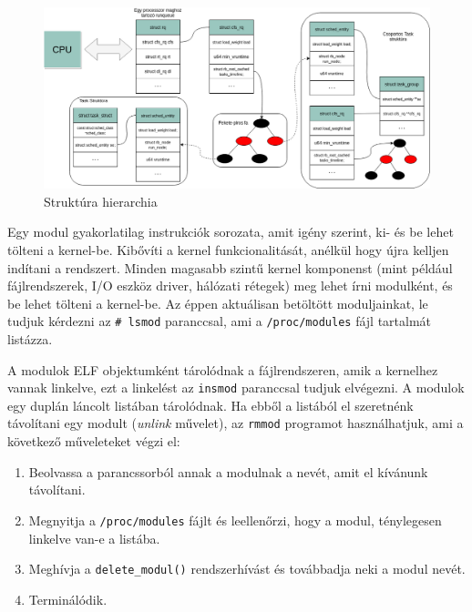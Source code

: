 \begin{figure}[h!]
\centering
\includegraphics[width=\textwidth]{images/structureHierarchy.png}
\caption{Struktúra hierarchia}
\label{fig:structurehierarchi}
\end{figure}



Egy modul gyakorlatilag instrukciók sorozata, amit igény szerint, ki- és be lehet tölteni a kernel-be. Kibővíti a kernel funkcionalitását, anélkül hogy újra kelljen indítani a rendszert. Minden magasabb szintű kernel komponenst (mint például fájlrendszerek, I/O eszköz driver, hálózati rétegek) meg lehet írni modulként, és be lehet tölteni a kernel-be.
Az éppen aktuálisan betöltött moduljainkat, le tudjuk kérdezni az \texttt{\# lsmod} paranccsal, ami a \texttt{/proc/modules} fájl tartalmát listázza.

A modulok ELF objektumként tárolódnak a fájlrendszeren, amik a kernelhez vannak linkelve, ezt a linkelést az \texttt{insmod} paranccsal tudjuk elvégezni.
A modulok egy duplán láncolt listában tárolódnak.
Ha ebből a listából el szeretnénk távolítani egy modult (\textit{unlink} művelet), az \texttt{rmmod} programot használhatjuk, ami a következő műveleteket végzi el:
\begin{enumerate}
	\item Beolvassa a parancssorból annak a modulnak a nevét, amit el kívánunk távolítani.
	\item Megnyitja a \texttt{/proc/modules} fájlt és leellenőrzi, hogy a modul, ténylegesen linkelve van-e a listába.
	\item Meghívja a \texttt{delete\_modul()} rendszerhívást és továbbadja neki a modul nevét.
	\item Terminálódik.
\end{enumerate} 

